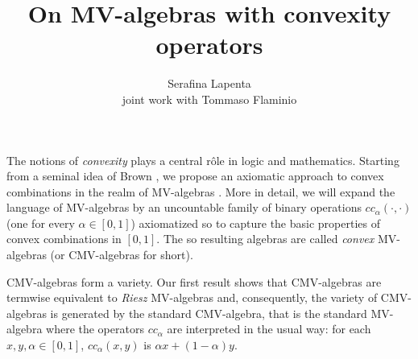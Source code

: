 \documentclass[10pt]{amsproc}
\newcommand{\luk}{\L u\-ka\-si\-e\-w\-icz}
\theoremstyle{definition}
\begin{document}
\title{On MV-algebras with convexity operators}
\author{Serafina Lapenta\\ joint work with Tommaso Flaminio}
\address{Department of Mathematics, University of Salerno. Via Ponte Don Melillo - 84084 Fisciano SA - Italy. \texttt{slapenta@unisa.it}}
\date{}

\maketitle


The notions of {\em convexity} plays a central r\^{o}le in logic and mathematics. Starting from a seminal idea of Brown \cite{Br}, we propose an axiomatic approach to convex combinations in the realm of MV-algebras \cite{CDM}. 
More in detail, we will expand the language of MV-algebras by an uncountable family of binary operations $cc_\alpha(\cdot, \cdot)$ (one for every $\alpha\in [0,1]$) axiomatized so to capture the basic properties of convex combinations in $[0,1]$. The so resulting algebras are called {\em convex} MV-algebras (or CMV-algebras for short). 

CMV-algebras form a variety. Our first result shows that CMV-algebras are termwise equivalent to {\em Riesz} MV-algebras \cite{DiNola-Leustean:RMV} and, consequently, the variety of CMV-algebras is generated by the standard CMV-algebra, that is the standard MV-algebra where the operators $cc_\alpha$ are interpreted in the usual way: for each $x,y,\alpha\in [0,1]$, $cc_\alpha(x,y)$ is $\alpha x+(1-\alpha)y$.   
\end{document}
